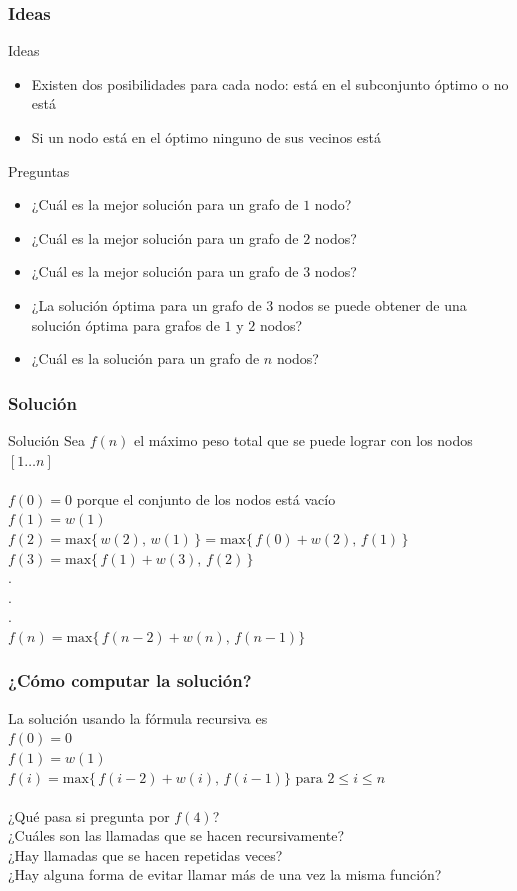 \documentclass{beamer}
\begin{document}
	\begin{frame}
		\frametitle{Ideas}
		\begin{block}{Ideas}
			\begin{itemize}
				\item Existen dos posibilidades para cada nodo: está en el subconjunto óptimo o no está
				\item Si un nodo está en el óptimo ninguno de sus vecinos está 
			\end{itemize}
		\end{block}
		\begin{alertblock}{Preguntas}
			\begin{itemize}
				\item ¿Cuál es la mejor solución para un grafo de $1$ nodo?
				\item ¿Cuál es la mejor solución para un grafo de $2$ nodos?
				\item ¿Cuál es la mejor solución para un grafo de $3$ nodos?\pause
				\item ¿La solución óptima para un grafo de $3$ nodos se puede obtener de una solución óptima para grafos de $1$ y $2$ nodos? \pause
				\item ¿Cuál es la solución para un grafo de $n$ nodos?
			\end{itemize}
		\end{alertblock}
	\end{frame}
	
	\begin{frame}
		\frametitle{Solución}
		\begin{block}{Solución}
			Sea $f(n)$ el máximo peso total que se puede lograr con los nodos $[1 \ldots n]$\\ \quad \\
			$f(0) = 0$ porque el conjunto de los nodos está vacío\\
			$f(1) = w(1)$\\
			$f(2) = \text{max}\{\,w(2),\, w(1)\,\} = \text{max}\{\,f(0) + w(2),\, f(1)\,\}$
			$f(3) = \text{max}\{\,f(1) + w(3),\, f(2)\,\}$\\
			.\\
			.\\
			.\\
			$f(n) = \text{max}\{\,f(n-2) + w(n),\, f(n-1)\}$
		\end{block}
	\end{frame}
	
	\begin{frame}
		\frametitle{¿Cómo computar la solución?}
		La solución usando la fórmula recursiva es\\
		$f(0) = 0$ \\
		$f(1) = w(1)$\\
		$f(i) = \text{max}\{\,f(i-2) + w(i),\, f(i-1)\} \text{  para } 2 \leq i \leq n$\\ \quad \\
		¿Qué pasa si pregunta por $f(4)$?\\
		¿Cuáles son las llamadas que se hacen recursivamente?\\
		¿Hay llamadas que se hacen repetidas veces?\\
		¿Hay alguna forma de evitar llamar más de una vez la misma función?
	\end{frame}
	
\end{document}
